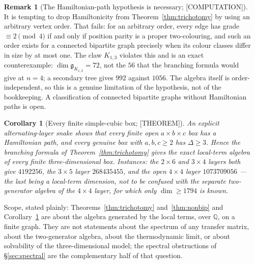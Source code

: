 \documentclass[11pt]{article}
\newtheorem{corollary}[theorem]{Corollary}
\theoremstyle{definition}
\newtheorem{remark}[theorem]{Remark}
\newcommand{\Qb}{\mathbb{Q}}
\newcommand{\alg}{\mathfrak{g}}
\begin{document}
\begin{remark}[The Hamiltonian-path hypothesis is necessary; {[COMPUTATION]}]
It is tempting to drop Hamiltonicity from Theorem~\ref{thm:trichotomy} by using an arbitrary vertex
order. That fails: for an arbitrary order, every edge has grade $\equiv2\pmod4$ if and only if
position parity is a proper two-colouring, and such an order exists for a connected bipartite graph
precisely when its colour classes differ in size by at most one. The claw $K_{1,3}$ violates this and
is an exact counterexample: $\dim\alg_{K_{1,3}}=72$, not the $56$ that the branching formula would
give at $n=4$; a secondary tree gives $992$ against $1056$. The algebra itself is
order-independent, so this is a genuine limitation of the hypothesis, not of the bookkeeping. A
classification of connected bipartite graphs without Hamiltonian paths is open.
\end{remark}

\begin{corollary}[Every finite simple-cubic box; {[THEOREM]}]\label{cor:box}
An explicit alternating-layer snake shows that every finite open $a\times b\times c$ box has a
Hamiltonian path, and every genuine box with $a,b,c\ge2$ has $\Delta\ge3$. Hence the branching
formula of Theorem~\ref{thm:trichotomy} gives the exact local-term algebra of every finite
three-dimensional box. Instances: the $2\times6$ and $3\times4$ layers both give $4192256$, the
$3\times5$ layer $268435455$, and the open $4\times4$ layer $1073709056$ --- the last being a
local-term dimension, not to be confused with the separate two-generator algebra of the $4\times4$
layer, for which only $\dim\ge1794$ is known.
\end{corollary}

Scope, stated plainly: Theorems~\ref{thm:trichotomy} and~\ref{thm:nonbip} and
Corollary~\ref{cor:box} are about the algebra generated by the local terms, over $\Qb$, on a finite
graph. They are not statements about the spectrum of any transfer matrix, about the two-generator
algebra, about the thermodynamic limit, or about solvability of the three-dimensional model; the
spectral obstructions of \S\ref{sec:spectral} are the complementary half of that question.
\end{document}
